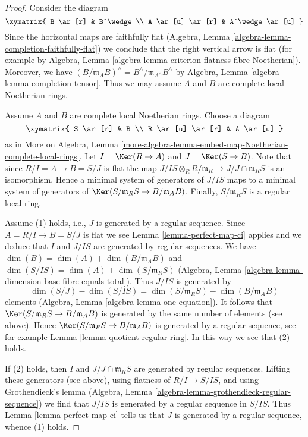 \begin{proof}
Consider the diagram
$$
\xymatrix{
B \ar[r] & B^\wedge \\
A \ar[u] \ar[r] & A^\wedge \ar[u]
}
$$
Since the horizontal maps are faithfully flat
(Algebra, Lemma \ref{algebra-lemma-completion-faithfully-flat})
we conclude that the right vertical arrow is flat
(for example by Algebra, Lemma
\ref{algebra-lemma-criterion-flatness-fibre-Noetherian}).
Moreover, we have
$(B/\mathfrak m_A B)^\wedge = B^\wedge/\mathfrak m_{A^\wedge} B^\wedge$
by Algebra, Lemma \ref{algebra-lemma-completion-tensor}.
Thus we may assume $A$ and $B$ are complete local Noetherian rings.

\medskip\noindent
Assume $A$ and $B$ are complete local Noetherian rings.
Choose a diagram
$$
\xymatrix{
S \ar[r] & B \\
R \ar[u] \ar[r] & A \ar[u]
}
$$
as in More on Algebra, Lemma
\ref{more-algebra-lemma-embed-map-Noetherian-complete-local-rings}.
Let $I = \Ker(R \to A)$ and $J = \Ker(S \to B)$.
Note that since $R/I = A \to B = S/J$ is flat the map
$J/IS \otimes_R R/\mathfrak m_R \to J/J \cap \mathfrak m_R S$
is an isomorphism. Hence a minimal system of generators of $J/IS$
maps to a minimal system of generators of
$\Ker(S/\mathfrak m_R S \to B/\mathfrak m_A B)$.
Finally, $S/\mathfrak m_R S$ is a regular local ring.

\medskip\noindent
Assume (1) holds, i.e., $J$ is generated by a regular sequence.
Since $A = R/I \to B = S/J$ is flat we see
Lemma \ref{lemma-perfect-map-ci} applies and we deduce
that $I$ and $J/IS$ are generated by regular sequences.
We have $\dim(B) = \dim(A) + \dim(B/\mathfrak m_A B)$ and
$\dim(S/IS) = \dim(A) + \dim(S/\mathfrak m_R S)$
(Algebra, Lemma \ref{algebra-lemma-dimension-base-fibre-equals-total}).
Thus $J/IS$ is generated by
$$
\dim(S/J) - \dim(S/IS) = \dim(S/\mathfrak m_R S) - \dim(B/\mathfrak m_A B)
$$
elements (Algebra, Lemma \ref{algebra-lemma-one-equation}).
It follows that $\Ker(S/\mathfrak m_R S \to B/\mathfrak m_A B)$
is generated by the same number of elements (see above).
Hence $\Ker(S/\mathfrak m_R S \to B/\mathfrak m_A B)$
is generated by a regular sequence, see for example
Lemma \ref{lemma-quotient-regular-ring}.
In this way we see that (2) holds.

\medskip\noindent
If (2) holds, then $I$ and $J/J \cap \mathfrak m_RS$
are generated by regular sequences. Lifting these generators
(see above), using flatness of $R/I \to S/IS$,
and using Grothendieck's lemma
(Algebra, Lemma \ref{algebra-lemma-grothendieck-regular-sequence})
we find that $J/IS$ is generated by a regular sequence in $S/IS$.
Thus Lemma \ref{lemma-perfect-map-ci} tells us that $J$
is generated by a regular sequence, whence (1) holds.
\end{proof}

